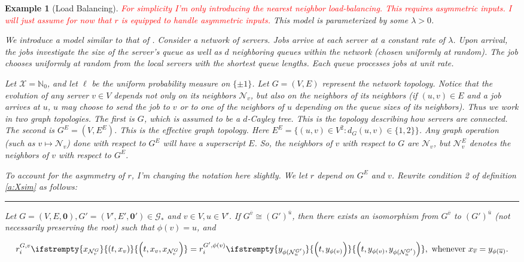 \documentclass[12pt]{article}
\newcommand{\mb}{\mathbb}
\newcommand{\mc}{\mathcal}
\newcommand{\ov}{\overline}
\newcommand{\te}{\text}
\newcommand{\tr}{\textcolor{red}}
\newcommand{\ind}{\hspace{24pt}}
\newcommand{\lin}{\rule{\linewidth}{0.4 pt}}
\newcommand{\sta}{\mc{X}}							%
\newcommand{\neigh}[1]{\mc{N}_{#1}}				%
\newcommand{\gneigh}[2]{\mc{N}^{#1}_{#2}}			%
\newcommand{\cl}[1]{\ov{#1}}						%
\renewcommand{\root}{\mathbf{0}}					%
\newcommand{\Sm}{\ell}								%
\newcommand{\rate}{r}								%
\newcommand{\xf}{x}									%
\newcommand{\xg}{y}									%
\newcommand{\vind}[1]{_{#1}}						%
\newcommand{\vpara}[1]{^{#1}}						%
\newcommand{\stpara}[1]{_{#1}}						%
\newcommand{\gvpara}[2]{^{#1,#2}}					%
\newcommand{\Gs}{\mc{G}_\ast}						%
\newcommand{\tmepro}[3]{
\ifstrempty{#3}{
	\left(#1,#2\right)}{
	\left(#1,#2,#3\right)}}							%
\renewcommand{\d}{d}								%
\newcommand{\eneigh}[1]{\mc{N}^E_{#1}}				%
\newtheorem{example}[thms]{Example}
\begin{document}
\begin{example}[Load Balancing]
\label{ex::lb}
\tr{For simplicity I'm only introducing the nearest neighbor load-balancing. This requires asymmetric inputs. I will just assume for now that \(\rate\) is equipped to handle asymmetric inputs.} This model is parameterized by some \(\lambda > 0\).

\ind We introduce a model similar to that of \cite{BudMukWu17}. Consider a network of servers. Jobs arrive at each server at a constant rate of \(\lambda\). Upon arrival, the jobs investigate the size of the server's queue as well as \(\d\) neighboring queues within the network (chosen uniformly at random). The job chooses uniformly at random from the local servers with the shortest queue lengths. Each queue processes jobs at unit rate.

\ind Let \(\sta = \mb{N}_0\), and let \(\Sm\) be the uniform probability measure on \(\{\pm 1\}\). Let \(G = (V,E)\) represent the network topology. Notice that the evolution of any server \(v \in V\) depends not only on its neighbors \(\neigh{v}\), but also on the neighbors of its neighbors (if \((u,v) \in E\) and a job arrives at \(u\), \(u\) may choose to send the job to \(v\) or to one of the neighbors of \(u\) depending on the queue sizes of its neighbors). Thus we work in two graph topologies. The first is \(G\), which is assumed to be a \(\d\)-Cayley tree. This is the topology describing how servers are connected. The second is \(G^E = (V,E^E)\). This is the effective graph topology. Here \(E^E = \{(u,v) \in V^2: d_G(u,v) \in \{1,2\}\}\). Any graph operation (such as \(v\mapsto \neigh{v}\)) done with respect to \(G^E\) will have a superscript \(E\). So, the neighbors of \(v\) with respect to \(G\) are \(\neigh{v}\), but \(\eneigh{v}\) denotes the neighbors of \(v\) with respect to \(G^E\).

\ind To account for the asymmetry of \(\rate\), I'm changing the notation here slightly. We let \(\rate\) depend on \(G^E\) and \(v\). Rewrite condition 2 of definition \ref{a:Xsim} as follows:

\lin

Let \(G = (V,E,\root), G' = (V',E',\root') \in \Gs\) and \(v \in V, u\in V'\). If \(G\vpara{\cl{v}} \cong (G')\vpara{\cl{u}}\), then there exists an isomorphism from \(G\vpara{\cl{v}}\) to \((G')\vpara{\cl{u}}\) (not necessarily preserving the root) such that \(\phi(v) = u\), and 

\[\rate\gvpara{G}{v}\stpara{i}\tmepro{t}{\xf\vind{v}}{\xf\vind{\gneigh{G}{v}}} = \rate\gvpara{G'}{\phi(v)}\stpara{i}\tmepro{t}{\xg\vind{\phi(v)}}{\xg\vind{\phi(\gneigh{G'}{u})}}, \te{ whenever } \xf\vind{\cl{v}} = \xg\vind{\phi(\cl{u})}.\]


\end{example}
\end{document}
